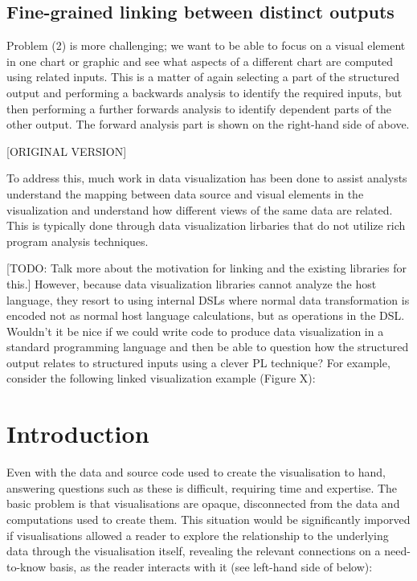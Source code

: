 \subsection{Fine-grained linking between distinct outputs}

Problem (2) is more challenging; we want to be able to focus on a visual element in one chart or graphic and see what aspects of a different chart are computed using related inputs. This is a matter of again selecting a part of the structured output and performing a backwards analysis to identify the required inputs, but then performing a further forwards analysis to identify dependent parts of the other output. The forward analysis part is shown on the right-hand side of  above.

[ORIGINAL VERSION]

To address this, much work in data visualization has been done to assist analysts understand the mapping between data source and visual elements in the visualization and understand how different views of the same data are related. This is typically done through data visualization lirbaries that do not utilize rich program analysis techniques.

[TODO: Talk more about the motivation for linking and the existing libraries for this.]
However, because data visualization libraries cannot analyze the host language, they resort to using internal DSLs where normal data transformation is encoded not as normal host language calculations, but as operations in the DSL. Wouldn't it be nice if we could write code to produce data visualization in a standard programming language and then be able to question how the structured output relates to structured inputs using a clever PL technique? For example, consider the following linked visualization example (Figure X):

\section{Introduction}

\noindent Even with the data and source code used to create the visualisation to hand, answering questions such as these is difficult, requiring time and expertise. The basic problem is that visualisations are opaque, disconnected from the data and computations used to create them. This situation would be significantly imporved if visualisations allowed a reader to explore the relationship to the underlying data through the visualisation itself, revealing the relevant connections on a need-to-know basis, as the reader interacts with it (see left-hand side of  below):

